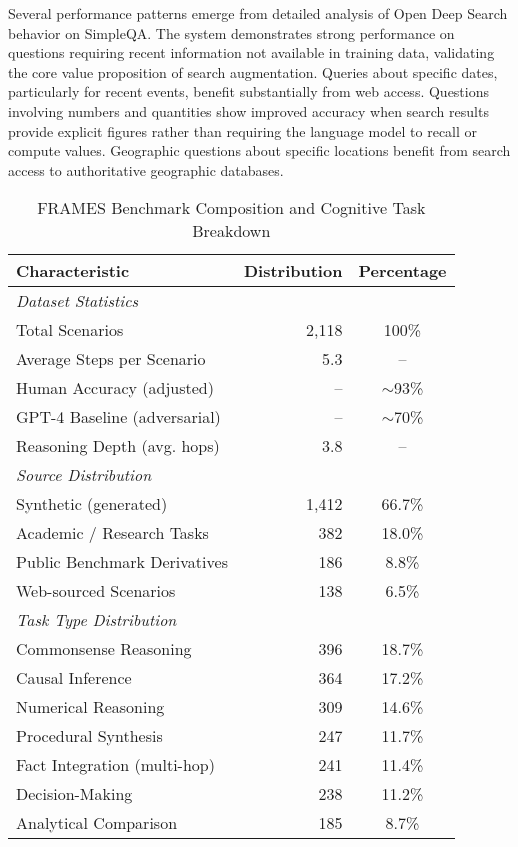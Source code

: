 Several performance patterns emerge from detailed analysis of Open Deep Search behavior on SimpleQA. The system demonstrates strong performance on questions requiring recent information not available in training data, validating the core value proposition of search augmentation. Queries about specific dates, particularly for recent events, benefit substantially from web access. Questions involving numbers and quantities show improved accuracy when search results provide explicit figures rather than requiring the language model to recall or compute values. Geographic questions about specific locations benefit from search access to authoritative geographic databases.

\begin{table}[htbp]
\centering
\caption{FRAMES Benchmark Composition and Cognitive Task Breakdown}
\label{tab:frames_characteristics}
\begin{tabular}{lrc}
\hline
\textbf{Characteristic} & \textbf{Distribution} & \textbf{Percentage} \\
\hline
\multicolumn{3}{l}{\textit{Dataset Statistics}} \\
Total Scenarios & 2,118 & 100\% \\
Average Steps per Scenario & 5.3 & -- \\
Human Accuracy (adjusted) & -- & $\sim$93\% \\
GPT-4 Baseline (adversarial) & -- & $\sim$70\% \\
Reasoning Depth (avg. hops) & 3.8 & -- \\
\hline
\multicolumn{3}{l}{\textit{Source Distribution}} \\
Synthetic (generated) & 1,412 & 66.7\% \\
Academic / Research Tasks & 382 & 18.0\% \\
Public Benchmark Derivatives & 186 & 8.8\% \\
Web-sourced Scenarios & 138 & 6.5\% \\
\hline
\multicolumn{3}{l}{\textit{Task Type Distribution}} \\
Commonsense Reasoning & 396 & 18.7\% \\
Causal Inference & 364 & 17.2\% \\
Numerical Reasoning & 309 & 14.6\% \\
Procedural Synthesis & 247 & 11.7\% \\
Fact Integration (multi-hop) & 241 & 11.4\% \\
Decision-Making & 238 & 11.2\% \\
Analytical Comparison & 185 & 8.7\% \\

\end{tabular}
\end{table}
